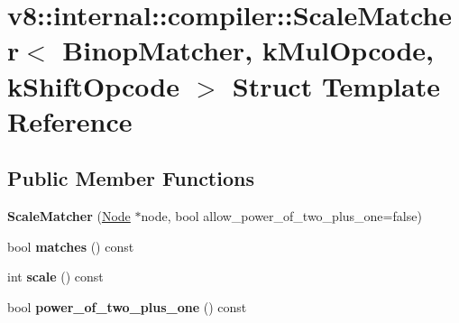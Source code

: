 \hypertarget{structv8_1_1internal_1_1compiler_1_1_scale_matcher}{}\section{v8\+:\+:internal\+:\+:compiler\+:\+:Scale\+Matcher$<$ Binop\+Matcher, k\+Mul\+Opcode, k\+Shift\+Opcode $>$ Struct Template Reference}
\label{structv8_1_1internal_1_1compiler_1_1_scale_matcher}
\subsection*{Public Member Functions}
\begin{DoxyCompactItemize}
\item 
{\bfseries Scale\+Matcher} (\hyperlink{classv8_1_1internal_1_1compiler_1_1_node}{Node} $\ast$node, bool allow\+\_\+power\+\_\+of\+\_\+two\+\_\+plus\+\_\+one=false)\hypertarget{structv8_1_1internal_1_1compiler_1_1_scale_matcher_a1c525a631da9105712e41efe3742906c}{}\label{structv8_1_1internal_1_1compiler_1_1_scale_matcher_a1c525a631da9105712e41efe3742906c}

\item 
bool {\bfseries matches} () const \hypertarget{structv8_1_1internal_1_1compiler_1_1_scale_matcher_aed3e1ae56541df39c73b3dc82cf81eab}{}\label{structv8_1_1internal_1_1compiler_1_1_scale_matcher_aed3e1ae56541df39c73b3dc82cf81eab}

\item 
int {\bfseries scale} () const \hypertarget{structv8_1_1internal_1_1compiler_1_1_scale_matcher_a311a548a01d449750c155643225a2b97}{}\label{structv8_1_1internal_1_1compiler_1_1_scale_matcher_a311a548a01d449750c155643225a2b97}

\item 
bool {\bfseries power\+\_\+of\+\_\+two\+\_\+plus\+\_\+one} () const \hypertarget{structv8_1_1internal_1_1compiler_1_1_scale_matcher_ab9edb5343232a1e6aef2ab11ab6a6d6f}{}\label{structv8_1_1internal_1_1compiler_1_1_scale_matcher_ab9edb5343232a1e6aef2ab11ab6a6d6f}

\end{DoxyCompactItemize}
